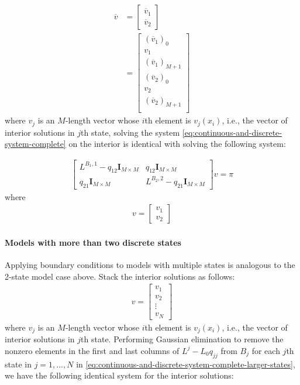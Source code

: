 \documentclass[11pt]{article}
\theoremstyle{definition}
\begin{document}
\begin{align}
\overline{v} &= 
\begin{bmatrix}
\overline{v}_1 \\
\overline{v}_2
\end{bmatrix} \\
&= \begin{bmatrix}
(\overline{v}_1)_0 \\
v_1 \\
(\overline{v}_1)_{M+1} \\
(\overline{v}_2)_0 \\
v_2\\
(\overline{v}_2)_{M+1} \\
\end{bmatrix}
\end{align}
where $v_j$ is an $M$-length vector whose $i$th element is $v_j (x_i)$, i.e., the vector of interior solutions in $j$th state, solving the system \eqref{eq:continuous-and-discrete-system-complete} on the interior is identical with solving the following system:

\begin{align}
\begin{bmatrix}
L^{B_1,1} - q_{12} \mathbf{I}_{M \times M} & q_{12} \mathbf{I}_{M \times M} \\
q_{21} \mathbf{I}_{M \times M} & L^{B_2,2} - q_{21} \mathbf{I}_{M \times M}
\end{bmatrix}
v
=
\pi 
\end{align}
where 
\begin{align}
v = \begin{bmatrix}
v_1 \\
v_2
\end{bmatrix}
\end{align}

\paragraph{Models with more than two discrete states} Applying boundary conditions to models with multiple states is analogous to the 2-state model case above. Stack the interior solutions as follows:
\begin{align}
v =
\begin{bmatrix}
v_1 \\
v_2 \\
\vdots \\
v_N
\end{bmatrix}
\end{align}
where $v_j$ is an $M$-length vector whose $i$th element is $v_j(x_i)$, i.e., the vector of interior solutions in $j$th state. Performing Gaussian elimination to remove the nonzero elements in the first and last columns of $L^j - L_{0} q_{jj}$ from $B_j$ for each $j$th state in $j = 1,...,N$ in \eqref{eq:continuous-and-discrete-system-complete-larger-states}, we have the following identical system for the interior solutions:
\end{document}
